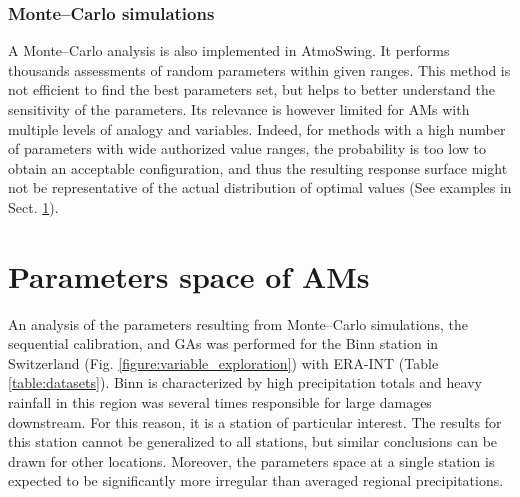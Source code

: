 \documentclass[review]{elsarticle}
\begin{document}
\subsubsection{Monte--Carlo simulations}
\label{sec:monte-carlo}

A Monte--Carlo analysis is also implemented in AtmoSwing. It performs thousands assessments of random parameters within given ranges. This method is not efficient to find the best parameters set, but helps to better understand the sensitivity of the parameters. Its relevance is however limited for AMs with multiple levels of analogy and variables. Indeed, for methods with a high number of parameters with wide authorized value ranges, the probability is too low to obtain an acceptable configuration, and thus the resulting response surface might not be representative of the actual distribution of optimal values (See examples in Sect. \ref{sec:parameters-space}). 


\section{Parameters space of AMs}
\label{sec:parameters-space}

An analysis of the parameters resulting from Monte--Carlo simulations, the sequential calibration, and GAs was performed for the Binn station in Switzerland (Fig. \ref{figure:variable_exploration}) with ERA-INT (Table \ref{table:datasets}). Binn is characterized by high precipitation totals and heavy rainfall in this region was several times responsible for large damages downstream. For this reason, it is a station of particular interest. The results for this station cannot be generalized to all stations, but similar conclusions can be drawn for other locations. Moreover, the parameters space at a single station is expected to be significantly more irregular than averaged regional precipitations.
\end{document}
